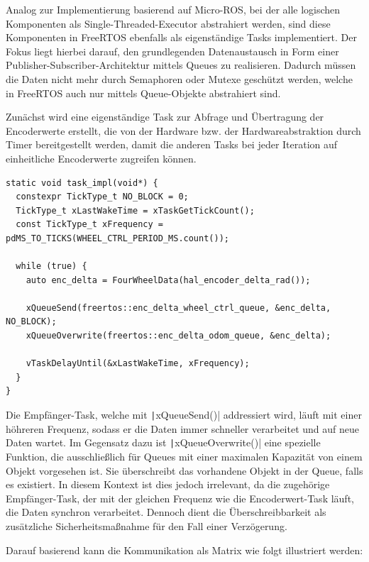 Analog zur Implementierung basierend auf Micro-ROS, bei der alle logischen
Komponenten als Single-Threaded-Executor abstrahiert werden, sind diese
Komponenten in FreeRTOS ebenfalls als eigenständige Tasks implementiert. Der
Fokus liegt hierbei darauf, den grundlegenden Datenaustausch in Form einer
Publisher-Subscriber-Architektur mittels Queues zu realisieren. Dadurch müssen
die Daten nicht mehr durch Semaphoren oder Mutexe geschützt werden, welche in
FreeRTOS auch nur mittels Queue-Objekte abstrahiert sind.

Zunächst wird eine eigenständige Task zur Abfrage und Übertragung der
Encoderwerte erstellt, die von der Hardware bzw. der Hardwareabstraktion durch
Timer bereitgestellt werden, damit die anderen Tasks bei jeder Iteration auf
einheitliche Encoderwerte zugreifen können.

\begin{code}
\begin{verbatim}
static void task_impl(void*) {
  constexpr TickType_t NO_BLOCK = 0;
  TickType_t xLastWakeTime = xTaskGetTickCount();
  const TickType_t xFrequency = pdMS_TO_TICKS(WHEEL_CTRL_PERIOD_MS.count());

  while (true) {
    auto enc_delta = FourWheelData(hal_encoder_delta_rad());

    xQueueSend(freertos::enc_delta_wheel_ctrl_queue, &enc_delta, NO_BLOCK);
    xQueueOverwrite(freertos::enc_delta_odom_queue, &enc_delta);

    vTaskDelayUntil(&xLastWakeTime, xFrequency);
  }
}
\end{verbatim}
\end{code}


Die Empfänger-Task, welche mit \texttt|xQueueSend()| addressiert wird,
läuft mit einer höhreren Frequenz, sodass er die Daten immer schneller
verarbeitet und auf neue Daten wartet. Im Gegensatz dazu ist
\texttt|xQueueOverwrite()| eine spezielle Funktion, die ausschließlich
für Queues mit einer maximalen Kapazität von einem Objekt vorgesehen ist. Sie
überschreibt das vorhandene Objekt in der Queue, falls es existiert. In diesem
Kontext ist dies jedoch irrelevant, da die zugehörige Empfänger-Task, der mit
der gleichen Frequenz wie die Encoderwert-Task läuft, die Daten synchron
verarbeitet. Dennoch dient die Überschreibbarkeit als zusätzliche
Sicherheitsmaßnahme für den Fall einer Verzögerung.

Darauf basierend kann die Kommunikation als Matrix wie folgt illustriert werden:

